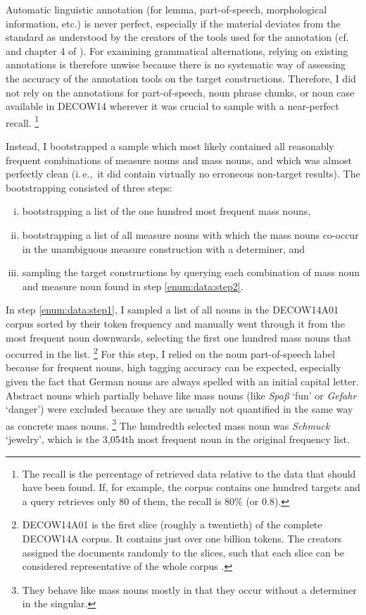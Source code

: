 \documentclass[USenglish]{article}
\newcommand{\ie}{i.\,e.,}
\begin{document}
Automatic linguistic annotation (for lemma, part-of-speech, morphological information, etc.) is never perfect, especially if the material deviates from the standard as understood by the creators of the tools used for the annotation (cf. \citealp{BeisswengerEa2016,GiesbrechtEvert2009} and chapter 4 of \citealp{SchaeferBildhauer2013}).
For examining grammatical alternations, relying on existing annotations is therefore unwise because there is no systematic way of assessing the accuracy of the annotation tools on the target constructions.
Therefore, I did not rely on the annotations for part-of-speech, noun phrase chunks, or noun case available in DECOW14 wherever it was crucial to sample with a near-perfect recall.%
\footnote{The recall is the percentage of retrieved data relative to the data that should have been found.
If, for example, the corpus contains one hundred targets and a query retrieves only 80 of them, the recall is 80\% (or 0.8).}

Instead, I bootstrapped a sample which most likely contained all reasonably frequent combinations of measure nouns and mass nouns, and which was almost perfectly clean (\ie\ it did contain virtually no erroneous non-target results).
The bootstrapping consisted of three steps:\\


\begin{enumerate}[i.]
  \item\label{enum:data:step1} bootstrapping a list of the one hundred most frequent mass nouns,
  \item\label{enum:data:step2} bootstrapping a list of all measure nouns with which the mass nouns co-occur in the unambiguous measure construction with a determiner, and
  \item\label{enum:data:step3} sampling the target constructions by querying each combination of mass noun and measure noun found in step \ref{enum:data:step2}.
\end{enumerate}

In step \ref{enum:data:step1}, I sampled a list of all nouns in the DECOW14A01 corpus sorted by their token frequency and manually went through it from the most frequent noun downwards, selecting the first one hundred mass nouns that occurred in the list.%
\footnote{DECOW14A01 is the first slice (roughly a twentieth) of the complete DECOW14A corpus.
It contains just over one billion tokens.
The creators assigned the documents randomly to the slices, such that each slice can be considered representative of the whole corpus \cite{Schaefer2015b}.}
For this step, I relied on the noun part-of-speech label because for frequent nouns, high tagging accuracy can be expected, especially given the fact that German nouns are always spelled with an initial capital letter.
Abstract nouns which partially behave like mass nouns (like \textit{Spaß} `fun’ or \textit{Gefahr} `danger’) were excluded because they are usually not quantified in the same way as concrete mass nouns.%
\footnote{They behave like mass nouns mostly in that they occur without a determiner in the singular.}
The hundredth selected mass noun was \textit{Schmuck} `jewelry’, which is the 3,054th most frequent noun in the original frequency list.
\end{document}
